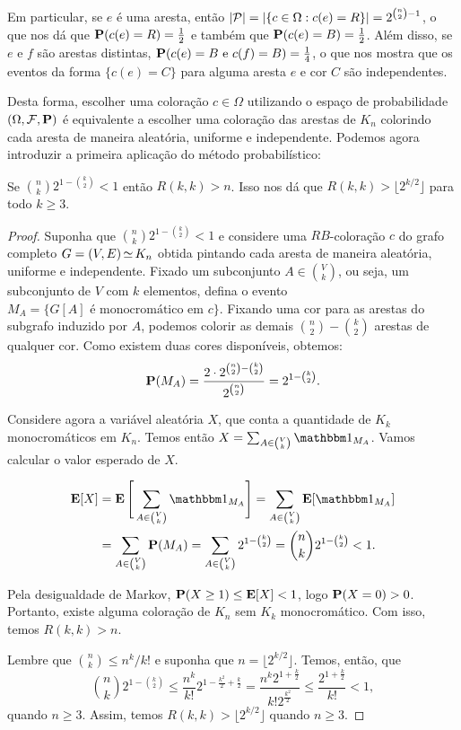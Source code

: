 Em particular, se $e$ é uma aresta, então $\left | \mathcal{P} \right | = \left | \{c \in \Omega : c(e) = R \} \right | = 2^{\binom{n}{2}-1}$, o que nos dá que $\operatorname{\mathbf{P}}(c(e) = R) = \frac{1}{2}$ e também que $\operatorname{\mathbf{P}}(c(e) = B) = \frac{1}{2}$.
Além disso, se $e$ e $f$ são arestas distintas, $\operatorname{\mathbf{P}}(c(e) = B \text{ e } c(f) = B) = \frac{1}{4}$, o que nos mostra que os eventos da forma $\{c(e) = C\}$ para alguma aresta $e$ e cor $C$ são independentes.

Desta forma, escolher uma coloração $c \in \Omega$ utilizando o espaço de probabilidade $(\Omega, \mathcal{F}, \operatorname{\mathbf{P}})$ é equivalente a escolher uma coloração das arestas de $K_n$ colorindo cada aresta de maneira aleatória, uniforme e independente. Podemos agora introduzir a primeira aplicação do método probabilístico:

\begin{theorem}[Erdös, 1947]
\label{thm:prob:method}
Se $\displaystyle \binom{n}{k} 2^{1 - \binom{k}{2}} < 1$ então $R(k,k) > n$. Isso nos dá que $R(k,k) > \lfloor 2^{k/2} \rfloor$ para todo $k \geq 3$.
\end{theorem}
\begin{proof}
Suponha que $\binom{n}{k} 2^{1 - \binom{k}{2}} < 1$ e considere uma $RB$-coloração $c$ do grafo completo $G = (V,E) \operatorname{\simeq} K_n$ obtida pintando cada aresta de maneira aleatória, uniforme e independente. Fixado um subconjunto $A \in \binom{V}{k}$, ou seja, um subconjunto de $V$ com $k$ elementos, defina o evento $M_A = \{G[A] \text{ é monocromático em } c\}$.
Fixando uma cor para as arestas do subgrafo induzido por $A$, podemos colorir as demais $\binom{n}{2} - \binom{k}{2}$ arestas de qualquer cor. Como existem duas cores disponíveis, obtemos:
\[ \operatorname{\mathbf{P}}(M_A) = \frac{2\cdot 2^{\binom{n}{2} - \binom{k}{2}}}{2^{\binom{n}{2}}}  = 2^{1 - \binom{k}{2}}. \]

Considere agora a variável aleatória $X$, que conta a quantidade de $K_k$ monocromáticos em $K_n$. Temos então $X = \sum_{A \in \binom{V}{k}}\ind{M_A}$. Vamos calcular o valor esperado de $X$.

\begin{align*}
\expec[X] &= \expec\Bigg[\sum_{A \in \binom{V}{k}}\ind{M_A} \Bigg] = \sum_{A \in \binom{V}{k}} \expec[\ind{M_A}] \\
&= \sum_{A \in \binom{V}{k}} \prob(M_A) = \sum_{A \in \binom{V}{k}} 2^{1 - \binom{k}{2}}  = \binom{n}{k} 2^{1 - \binom{k}{2}} < 1.
\end{align*}

Pela desigualdade de Markov, $\operatorname{\mathbf{P}}(X \geq 1) \leq \operatorname{\mathbf{E}}[X] < 1$, logo $\operatorname{\mathbf{P}}(X = 0) > 0$. Portanto, existe alguma coloração de $K_n$ sem $K_k$ monocromático. Com isso, temos $R(k,k) > n$.

Lembre que $\binom{n}{k} \leq n^k /k!$ e suponha que $n = \lfloor 2^{k/2} \rfloor$. Temos, então, que
\[ \binom{n}{k}2^{1 - \binom{k}{2}} \leq \frac{n^k}{k!}2^{1 - \frac{k^2}{2} + \frac{k}{2}} = \frac{n^k 2^{1 + \frac{k}{2}}}{k!2^{\frac{k^2}{2}}} \leq \frac{2^{1 + \frac{k}{2}}}{k!} < 1, \]
quando $n \geq 3$. Assim, temos $R(k,k) > \lfloor 2^{k/2} \rfloor$ quando $n \geq 3$.
\end{proof}

